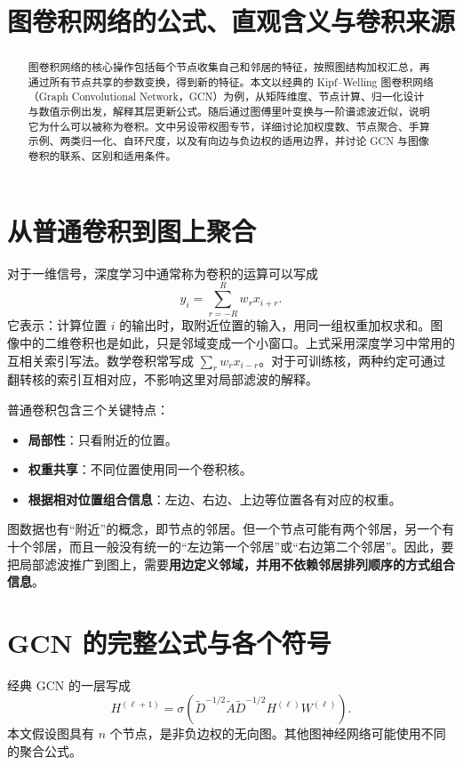 \documentclass[UTF8,a4paper,11pt,fontset=fandol]{ctexart}
\title{图卷积网络的公式、直观含义与卷积来源}
\author{}
\date{}
\begin{document}
\maketitle
\begin{abstract}
图卷积网络的核心操作包括每个节点收集自己和邻居的特征，按照图结构加权汇总，再通过所有节点共享的参数变换，得到新的特征。本文以经典的 Kipf--Welling 图卷积网络（Graph Convolutional Network，GCN）为例，从矩阵维度、节点计算、归一化设计与数值示例出发，解释其层更新公式。随后通过图傅里叶变换与一阶谱滤波近似，说明它为什么可以被称为卷积。文中另设带权图专节，详细讨论加权度数、节点聚合、手算示例、两类归一化、自环尺度，以及有向边与负边权的适用边界，并讨论 GCN 与图像卷积的联系、区别和适用条件。
\end{abstract}
\tableofcontents
\newpage

\section{从普通卷积到图上聚合}
对于一维信号，深度学习中通常称为卷积的运算可以写成
\begin{equation}
y_i=\sum_{r=-R}^{R}w_r x_{i+r}.
\end{equation}
它表示：计算位置 $i$ 的输出时，取附近位置的输入，用同一组权重加权求和。图像中的二维卷积也是如此，只是邻域变成一个小窗口。上式采用深度学习中常用的互相关索引写法。数学卷积常写成 $\sum_r w_r x_{i-r}$。对于可训练核，两种约定可通过翻转核的索引互相对应，不影响这里对局部滤波的解释。

普通卷积包含三个关键特点：
\begin{itemize}
\item \textbf{局部性}：只看附近的位置。
\item \textbf{权重共享}：不同位置使用同一个卷积核。
\item \textbf{根据相对位置组合信息}：左边、右边、上边等位置各有对应的权重。
\end{itemize}
图数据也有“附近”的概念，即节点的邻居。但一个节点可能有两个邻居，另一个有十个邻居，而且一般没有统一的“左边第一个邻居”或“右边第二个邻居”。因此，要把局部滤波推广到图上，需要\textbf{用边定义邻域，并用不依赖邻居排列顺序的方式组合信息}。

\section{GCN 的完整公式与各个符号}
经典 GCN 的一层写成
\begin{equation}
\boxed{
H^{(\ell+1)}=\sigma\!\left(
\widetilde D^{-1/2}\widetilde A\widetilde D^{-1/2}
H^{(\ell)}W^{(\ell)}\right).
}
\label{eq:gcn}
\end{equation}
本文假设图具有 $n$ 个节点，是非负边权的无向图。其他图神经网络可能使用不同的聚合公式。
\end{document}
